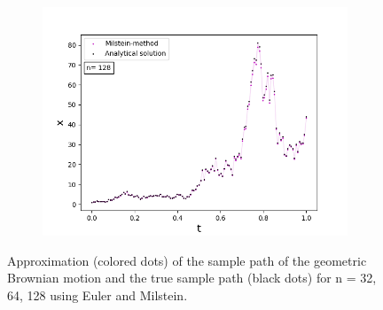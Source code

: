 \begin{figure}[!h]
\begin{subfigure}{0.49\linewidth}
   \end{subfigure}
   \begin{subfigure}{0.49\linewidth} \centering
     \includegraphics[scale=0.4]{Content/Graphics/Appendix/6gbm}
   \end{subfigure}
\caption{Approximation (colored dots) of the sample path of the geometric Brownian motion and the true sample path (black dots) for n = 32, 64, 128 using Euler and Milstein.}
\end{figure}


